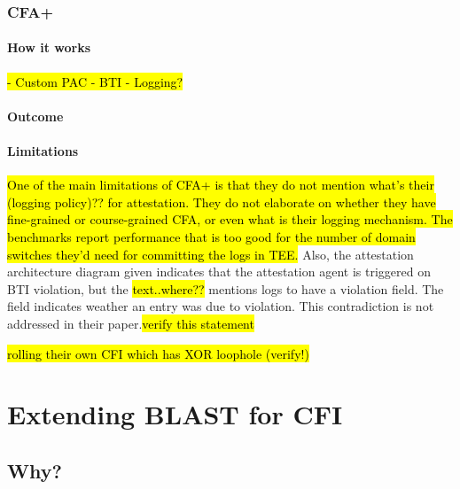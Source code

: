 \documentclass[a4paper, nobind]{templates/ociamthesis}
\begin{document}
\subsection{CFA+}\label{cfa-1}

\subsubsection{How it works}\label{how-it-works-1}

\hl{- Custom PAC
- BTI
- Logging?}

\subsubsection{Outcome}\label{outcome-1}

\subsubsection{Limitations}\label{limitations-1}

\hl{One of the main limitations of CFA+ is that they do not mention what's their
(logging policy)?? for attestation. They do not elaborate on whether they have
fine-grained or course-grained CFA, or even what is their logging mechanism.
The benchmarks report performance that is too good for the number of domain
switches they'd need for committing the logs in TEE.}
Also, the attestation architecture diagram given indicates that the attestation
agent is triggered on BTI violation, but the \hl{text..where??}
mentions logs to have a violation field. The field indicates weather an entry was due to violation.
This contradiction is not addressed in their paper.\hl{verify this statement}

\hl{rolling their own CFI which has XOR loophole (verify!)}

\chapter{Extending BLAST for CFI}\label{extending-blast-for-cfi}

\minitoc 

\section{Why?}\label{why-1}
\end{document}
